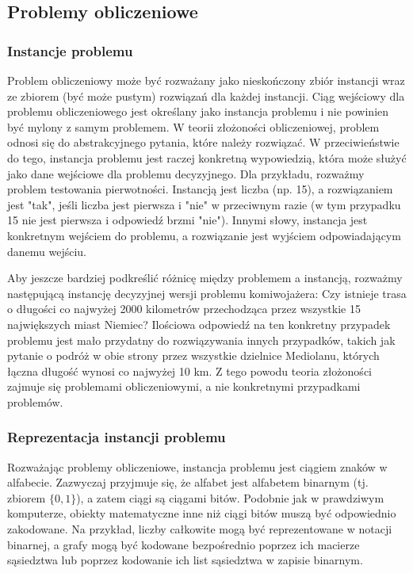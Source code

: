 	\subsection{Problemy obliczeniowe}

		\subsubsection{Instancje problemu}
Problem obliczeniowy może być rozważany jako nieskończony zbiór instancji wraz ze zbiorem (być może pustym) rozwiązań dla każdej instancji. Ciąg wejściowy dla problemu obliczeniowego jest określany jako instancja problemu i nie powinien być mylony z samym problemem. W teorii złożoności obliczeniowej, problem odnosi się do abstrakcyjnego pytania, które należy rozwiązać. W przeciwieństwie do tego, instancja problemu jest raczej konkretną wypowiedzią, która może służyć jako dane wejściowe dla problemu decyzyjnego. Dla przykładu, rozważmy problem testowania pierwotności. Instancją jest liczba (np. 15), a rozwiązaniem jest "tak", jeśli liczba jest pierwsza i "nie" w przeciwnym razie (w tym przypadku 15 nie jest pierwsza i odpowiedź brzmi "nie"). Innymi słowy, instancja jest konkretnym wejściem do problemu, a rozwiązanie jest wyjściem odpowiadającym danemu wejściu.

Aby jeszcze bardziej podkreślić różnicę między problemem a instancją, rozważmy następującą instancję decyzyjnej wersji problemu komiwojażera: Czy istnieje trasa o długości co najwyżej 2000 kilometrów przechodząca przez wszystkie 15 największych miast Niemiec? Ilościowa odpowiedź na ten konkretny przypadek problemu jest mało przydatny do rozwiązywania innych przypadków, takich jak pytanie o podróż w obie strony przez wszystkie dzielnice Mediolanu, których łączna długość wynosi co najwyżej 10 km. Z tego powodu teoria złożoności zajmuje się problemami obliczeniowymi, a nie konkretnymi przypadkami problemów.

		\subsubsection{Reprezentacja instancji problemu}

Rozważając problemy obliczeniowe, instancja problemu jest ciągiem znaków w alfabecie. Zazwyczaj przyjmuje się, że alfabet jest alfabetem binarnym (tj. zbiorem $\{0,1\}$), a zatem ciągi są ciągami bitów. Podobnie jak w prawdziwym komputerze, obiekty matematyczne inne niż ciągi bitów muszą być odpowiednio zakodowane. Na przykład, liczby całkowite mogą być reprezentowane w notacji binarnej, a grafy mogą być kodowane bezpośrednio poprzez ich macierze sąsiedztwa lub poprzez kodowanie ich list sąsiedztwa w zapisie binarnym.

